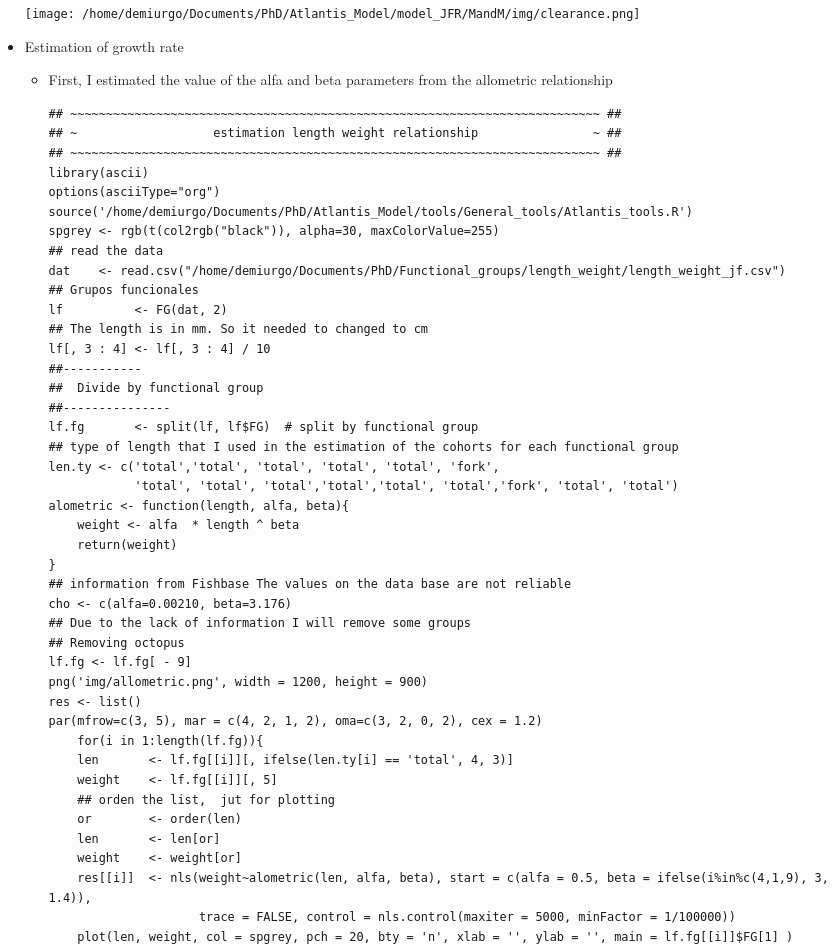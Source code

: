\documentclass[11pt]{article}
\begin{document}
\begin{itemize}
\texttt{[image: /home/demiurgo/Documents/PhD/Atlantis\_Model/model\_JFR/MandM/img/clearance.png]}


\item Estimation of growth rate
\label{sec-5-2-1-8-4}%
\begin{itemize}
\item First, I estimated the value of the alfa and beta parameters from the allometric relationship

\begin{verbatim}
## ~~~~~~~~~~~~~~~~~~~~~~~~~~~~~~~~~~~~~~~~~~~~~~~~~~~~~~~~~~~~~~~~~~~~~~~~~~ ##
## ~                   estimation length weight relationship                ~ ##
## ~~~~~~~~~~~~~~~~~~~~~~~~~~~~~~~~~~~~~~~~~~~~~~~~~~~~~~~~~~~~~~~~~~~~~~~~~~ ##
library(ascii)
options(asciiType="org")
source('/home/demiurgo/Documents/PhD/Atlantis_Model/tools/General_tools/Atlantis_tools.R')
spgrey <- rgb(t(col2rgb("black")), alpha=30, maxColorValue=255)
## read the data
dat    <- read.csv("/home/demiurgo/Documents/PhD/Functional_groups/length_weight/length_weight_jf.csv")
## Grupos funcionales
lf          <- FG(dat, 2)
## The length is in mm. So it needed to changed to cm
lf[, 3 : 4] <- lf[, 3 : 4] / 10
##-----------
##  Divide by functional group
##---------------
lf.fg       <- split(lf, lf$FG)  # split by functional group
## type of length that I used in the estimation of the cohorts for each functional group
len.ty <- c('total','total', 'total', 'total', 'total', 'fork',
            'total', 'total', 'total','total','total', 'total','fork', 'total', 'total')
alometric <- function(length, alfa, beta){
    weight <- alfa  * length ^ beta
    return(weight)
}
## information from Fishbase The values on the data base are not reliable
cho <- c(alfa=0.00210, beta=3.176)
## Due to the lack of information I will remove some groups
## Removing octopus
lf.fg <- lf.fg[ - 9]
png('img/allometric.png', width = 1200, height = 900)
res <- list()
par(mfrow=c(3, 5), mar = c(4, 2, 1, 2), oma=c(3, 2, 0, 2), cex = 1.2)
    for(i in 1:length(lf.fg)){
    len       <- lf.fg[[i]][, ifelse(len.ty[i] == 'total', 4, 3)]
    weight    <- lf.fg[[i]][, 5]
    ## orden the list,  jut for plotting
    or        <- order(len)
    len       <- len[or]
    weight    <- weight[or]
    res[[i]]  <- nls(weight~alometric(len, alfa, beta), start = c(alfa = 0.5, beta = ifelse(i%in%c(4,1,9), 3, 1.4)),
                     trace = FALSE, control = nls.control(maxiter = 5000, minFactor = 1/100000))
    plot(len, weight, col = spgrey, pch = 20, bty = 'n', xlab = '', ylab = '', main = lf.fg[[i]]$FG[1] )

\end{verbatim}
\end{itemize}
\end{itemize}
\end{document}

